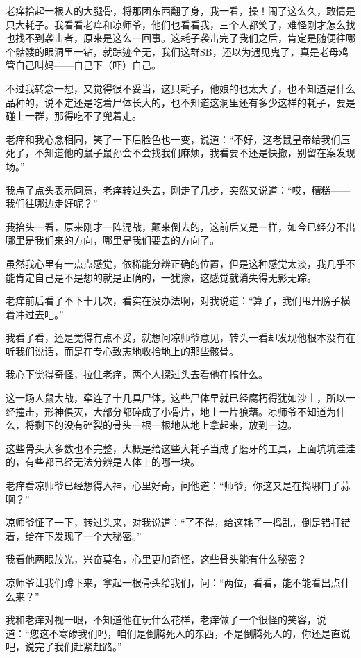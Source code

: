 老痒拾起一根人的大腿骨，将那团东西翻了身，我一看，操！闹了这么久，敢情是只大耗子。我看看老痒和凉师爷，他们也看看我，三个人都笑了，难怪刚才怎么找也找不到袭击者，原来是这么一回事。这耗子袭击完了我们之后，肯定是随便往哪个骷髅的眼洞里一钻，就踪迹全无，我们这群SB，还以为遇见鬼了，真是老母鸡管自己叫妈——自己下（吓）自己。

不过我转念一想，又觉得很不妥当，这只耗子，他娘的也太大了，也不知道是什么品种的，说不定还是吃着尸体长大的，也不知道这洞里还有多少这样的耗子，要是碰上一群，那得吃不了兜着走。

老痒和我心念相同，笑了一下后脸色也一变，说道：“不好，这老鼠皇帝给我们压死了，不知道他的鼠子鼠孙会不会找我们麻烦，我看要不还是快撤，别留在案发现场。”

我点了点头表示同意，老痒转过头去，刚走了几步，突然又说道：“哎，糟糕——我们往哪边走好呢？”

我抬头一看，原来刚才一阵混战，颠来倒去的，这前后又是一样，如今已经分不出哪里是我们来的方向，哪里是我们要去的方向了。

虽然我心里有一点点感觉，依稀能分辨正确的位置，但是这种感觉太淡，我几乎不能肯定自己是不是想的就是正确的，一犹豫，这感觉就消失得无影无踪。

老痒前后看了不下十几次，看实在没办法啊，对我说道：“算了，我们甩开膀子横着冲过去吧。”

我看了看，还是觉得有点不妥，就想问凉师爷意见，转头一看却发现他根本没有在听我们说话，而是在专心致志地收拾地上的那些骸骨。

我心下觉得奇怪，拉住老痒，两个人探过头去看他在搞什么。

这一场人鼠大战，牵连了十几具尸体，这些尸体早就已经腐朽得犹如沙土，所以一经撞击，形神俱灭，大部分都碎成了小骨片，地上一片狼藉。凉师爷不知道为什么，将剩下的没有碎裂的骨头一根一根地从地上拿起来，放到一边。

这些骨头大多数也不完整，大概是给这些大耗子当成了磨牙的工具，上面坑坑洼洼的，有些都已经无法分辨是人体上的哪一块。

老痒看凉师爷已经想得入神，心里好奇，问他道：“师爷，你这又是在捣哪门子蒜啊？”

凉师爷怔了一下，转过头来，对我说道：“了不得，给这耗子一捣乱，倒是错打错着，给在下发现了一个大秘密。”

我看他两眼放光，兴奋莫名，心里更加奇怪，这些骨头能有什么秘密？

凉师爷让我们蹲下来，拿起一根骨头给我们，问：“两位，看看，能不能看出点什么来？”

我和老痒对视一眼，不知道他在玩什么花样，老痒做了一个很怪的笑容，说道：“您这不寒碜我们吗，咱们是倒腾死人的东西，不是倒腾死人的，你还是直说吧，说完了我们赶紧赶路。”

